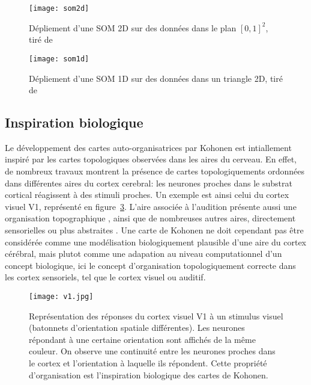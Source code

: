 \documentclass[../main]{subfiles}
\begin{document}
\begin{figure}
\centering
\texttt{[image: som2d]}
\caption{Dépliement d'une SOM 2D sur des données dans le plan $[0,1]^2$, tiré de~\cite{Kohonen1995SelfOrganizingM} \label{fig:som2d}}

\end{figure}

\begin{figure}
\centering
\texttt{[image: som1d]}
\caption{Dépliement d'une SOM 1D sur des données dans un triangle 2D, tiré de~\cite{Kohonen1995SelfOrganizingM}\label{fig:som1d}}

\end{figure}


\subsection{Inspiration biologique}


Le développement des cartes auto-organisatrices par Kohonen est intiallement inspiré par les cartes topologiques observées dans les aires du cerveau. 
En effet, de nombreux travaux montrent la présence de cartes topologiquements ordonnées dans différentes aires du cortex cerebral:
les neurones proches dans le substrat cortical réagissent à des stimuli proches. 
Un exemple est ainsi celui du cortex visuel V1, représenté en figure~\ref{fig:v1}. 
L'aire associée à l'audition présente aussi une organisation topographique \cite{Reale1980TonotopicOI}, ainsi que de nombreuses autres aires, directement sensorielles ou plus abstraites \cite{Kohonen1995SelfOrganizingM}. 
Une carte de Kohonen ne doit cependant pas être considérée comme une modélisation biologiquement plausible d'une aire du cortex cérébral, mais plutot comme une adapation au niveau computationnel d'un concept biologique, ici le concept d'organisation topologiquement correcte dans les cortex sensoriels, tel que le cortex visuel ou auditif.

\begin{figure}
\centering
\texttt{[image: v1.jpg]}
\caption{Représentation des réponses du cortex visuel V1 à un stimulus visuel (batonnets d'orientation spatiale différentes). Les neurones répondant à une certaine orientation sont affichés de la même couleur. On observe une continuité entre les neurones proches dans le cortex et l'orientation à laquelle ils répondent. Cette propriété d'organisation est l'inspiration biologique des cartes de Kohonen.}
\label{fig:v1}
\end{figure}
\end{document}

